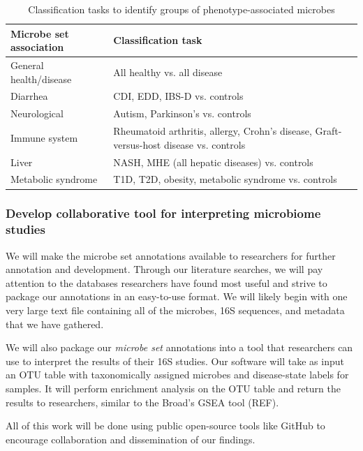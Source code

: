 \documentclass[12pt]{article}
\begin{document}
\begin{table}
\begin{center}
\begin{tabular}{|p{6cm}|p{10cm}|}
	\hline
	\textbf{Microbe set association} & \textbf{Classification task} \\
	\hline
	General health/disease & All healthy vs. all disease \\
	\hline
	Diarrhea & CDI, EDD, IBS-D vs. controls \\
	\hline
	Neurological & Autism, Parkinson's vs. controls \\
	\hline
	Immune system & Rheumatoid arthritis, allergy, Crohn's disease, Graft-versus-host disease vs. controls \\
	\hline
	Liver & NASH, MHE (all hepatic diseases) vs. controls\\
	\hline
	Metabolic syndrome & T1D, T2D, obesity, metabolic syndrome vs. controls \\
	\hline
\end{tabular}
\caption{Classification tasks to identify groups of phenotype-associated microbes}\label{tab:classifications}
\end{center}
\end{table}

\subsubsection{Develop collaborative tool for interpreting microbiome studies}
We will make the microbe set annotations available to researchers for further annotation and development. Through our literature searches, we will pay attention to the databases researchers have found most useful and strive to package our annotations in an easy-to-use format. We will likely begin with one very large text file containing all of the microbes, 16S sequences, and metadata that we have gathered. 

We will also package our \textit{microbe set} annotations into a tool that researchers can use to interpret the results of their 16S studies. Our software will take as input an OTU table with taxonomically assigned microbes and disease-state labels for samples. It will perform enrichment analysis on the OTU table and return the results to researchers, similar to the Broad's GSEA tool (REF).

All of this work will be done using public open-source tools like GitHub to encourage collaboration and dissemination of our findings.
\end{document}

